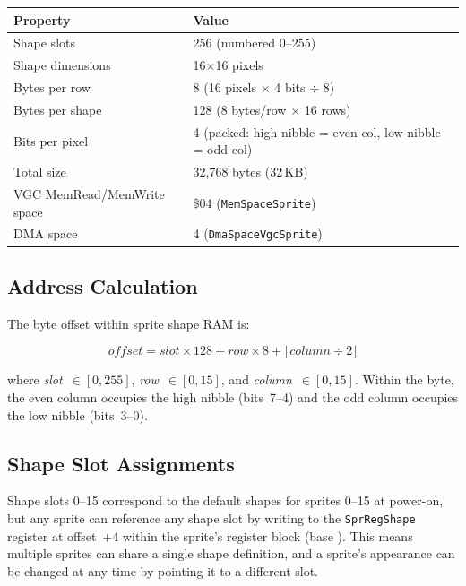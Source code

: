 \begin{center}
\small
\begin{tabular}{@{}ll@{}}
\toprule
\textbf{Property}         & \textbf{Value} \\
\midrule
Shape slots                & 256 (numbered 0--255) \\
Shape dimensions           & 16$\times$16 pixels \\
Bytes per row              & 8 (16 pixels $\times$ 4 bits $\div$ 8) \\
Bytes per shape            & 128 (8 bytes/row $\times$ 16 rows) \\
Bits per pixel             & 4 (packed: high nibble = even col, low nibble = odd col) \\
Total size                 & 32,768 bytes (32\,KB) \\
VGC MemRead/MemWrite space & \$04 (\texttt{MemSpaceSprite}) \\
DMA space                  & 4 (\texttt{DmaSpaceVgcSprite}) \\
\bottomrule
\end{tabular}
\end{center}

\subsection{Address Calculation}

The byte offset within sprite shape RAM is:

\[
  \textit{offset} = \textit{slot} \times 128 + \textit{row} \times 8 + \lfloor\textit{column} \div 2\rfloor
\]

where \textit{slot}~$\in [0, 255]$, \textit{row}~$\in [0, 15]$, and
\textit{column}~$\in [0, 15]$.  Within the byte, the even column occupies the
high nibble (bits~7--4) and the odd column occupies the low nibble (bits~3--0).

\subsection{Shape Slot Assignments}

\begin{notebox}
Shape slots 0--15 correspond to the default shapes for sprites 0--15 at
power-on, but any sprite can reference any shape slot by writing to the
\texttt{SprRegShape} register at offset~+4 within the sprite's register block
(base ).  This means multiple sprites can share a single shape
definition, and a sprite's appearance can be changed at any time by pointing it
to a different slot.
\end{notebox}

